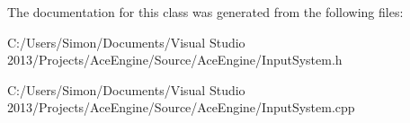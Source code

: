 The documentation for this class was generated from the following files\+:\begin{DoxyCompactItemize}
\item 
C\+:/\+Users/\+Simon/\+Documents/\+Visual Studio 2013/\+Projects/\+Ace\+Engine/\+Source/\+Ace\+Engine/Input\+System.\+h\item 
C\+:/\+Users/\+Simon/\+Documents/\+Visual Studio 2013/\+Projects/\+Ace\+Engine/\+Source/\+Ace\+Engine/Input\+System.\+cpp\end{DoxyCompactItemize}
